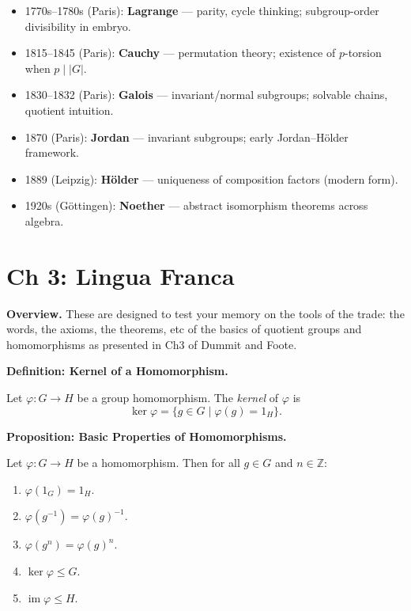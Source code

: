 \documentclass[9pt]{article}
\theoremstyle{definition}
\begin{document}
\newpage

\begin{itemize}
  \item 1770s–1780s (Paris): \textbf{Lagrange} — parity, cycle thinking; subgroup-order divisibility in embryo.
  \item 1815–1845 (Paris): \textbf{Cauchy} — permutation theory; existence of $p$-torsion when $p\mid |G|$.
  \item 1830–1832 (Paris): \textbf{Galois} — invariant/normal subgroups; solvable chains, quotient intuition.
  \item 1870 (Paris): \textbf{Jordan} — invariant subgroups; early Jordan–Hölder framework.
  \item 1889 (Leipzig): \textbf{Hölder} — uniqueness of composition factors (modern form).
  \item 1920s (Göttingen): \textbf{Noether} — abstract isomorphism theorems across algebra.
\end{itemize}

\newpage


\dotfill
\section*{Ch 3: Lingua Franca}
\dotfill

\newpage

\noindent \textbf{Overview.} These are designed to test your memory on the tools of the trade: the words, the axioms, the theorems, etc of the basics of quotient groups and homomorphisms as presented in Ch3 of Dummit and Foote.

\newpage

\noindent\textbf{Definition: Kernel of a Homomorphism.}

\newpage

Let $\varphi:G\to H$ be a group homomorphism. The \emph{kernel} of $\varphi$ is
\[
\ker\varphi=\{g\in G\mid \varphi(g)=1_H\}.
\]

\newpage

\noindent\textbf{Proposition: Basic Properties of Homomorphisms.}

\newpage

Let $\varphi:G\to H$ be a homomorphism. Then for all $g\in G$ and $n\in\mathbb Z$:
\begin{enumerate}
  \item $\varphi(1_G)=1_H$.
  \item $\varphi(g^{-1})=\varphi(g)^{-1}$.
  \item $\varphi(g^n)=\varphi(g)^n$.
  \item $\ker\varphi\le G$.
  \item $\operatorname{im}\varphi\le H$.
\end{enumerate}
\end{document}
